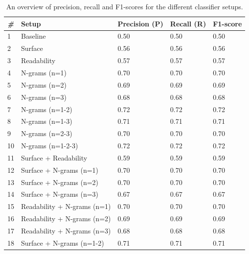 \documentclass[
10pt, %
a4paper, %
oneside, %
headinclude,footinclude, %
] {book}%
\begin{document}
\begin{table}[]
\caption{An overview of precision, recall and F1-scores for the different classifier setups.}
\label{results-overview}
\begin{tabular}{@{}lllll@{}}
\toprule
\textit{\#} & \textbf{Setup}                & \textbf{Precision (P)} & \textbf{Recall (R)} &\textbf{F1-score}   \\ \midrule
1  & Baseline                                  & 0.50           & 0.50        & 0.50 \\
2  & Surface                                   & 0.56          & 0.56       & 0.56 \\
3  & Readability                               & 0.57          & 0.57       & 0.57 \\
4  & N-grams (n=1)                             & 0.70          & 0.70       & 0.70 \\
5  & N-grams (n=2)                             & 0.69          & 0.69       & 0.69 \\
6  & N-grams (n=3)                             & 0.68          & 0.68       & 0.68 \\
7  & N-grams (n=1-2)                           & 0.72          & 0.72       & 0.72 \\
8  & N-grams (n=1-3)                           & 0.71          & 0.71       & 0.71 \\
9  & N-grams (n=2-3)                           & 0.70          & 0.70       & 0.70 \\
10 & N-grams (n=1-2-3)                         & 0.72          & 0.72       & 0.72 \\
11 & Surface + Readability                     & 0.59          & 0.59       & 0.59 \\
12 & Surface + N-grams (n=1)                   & 0.70          & 0.70       & 0.70 \\
13 & Surface + N-grams (n=2)                   & 0.70          & 0.70       & 0.70 \\
14 & Surface + N-grams (n=3)                   & 0.67          & 0.67       & 0.67 \\
15 & Readability + N-grams (n=1)               & 0.70          & 0.70       & 0.70 \\
16 & Readability + N-grams (n=2)               & 0.69          & 0.69       & 0.69 \\
17 & Readability + N-grams (n=3)               & 0.68          & 0.68       & 0.68 \\
18 & Surface + N-grams (n=1-2)                 & 0.71          & 0.71       & 0.71 \\

\end{tabular}
\end{table}
\end{document}
